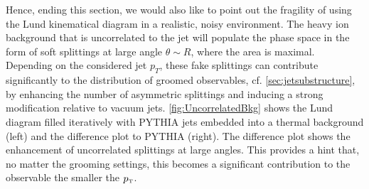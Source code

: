 Hence, ending this section, we would also like to point out the fragility of using the Lund kinematical diagram in a realistic, noisy environment.
The heavy ion background that is uncorrelated to the jet will populate the phase space in the form of soft splittings at large angle $\theta \sim R$, where the area is maximal. Depending on the considered jet $p_{T}$, these fake splittings can contribute significantly to the distribution of groomed observables, cf. \autoref{sec:jetsubstructure}, by enhancing the number of asymmetric splittings and inducing a strong modification relative to vacuum jets. 
\autoref{fig:UncorrelatedBkg} shows the Lund diagram filled iteratively with PYTHIA jets embedded into a thermal background (left) and the difference plot to PYTHIA (right). The difference plot shows the enhancement of uncorrelated splittings at large angles. 
This provides a hint that, no matter the grooming settings, this becomes a significant contribution to the observable the smaller the $p_{\text{\tiny T}}$.

